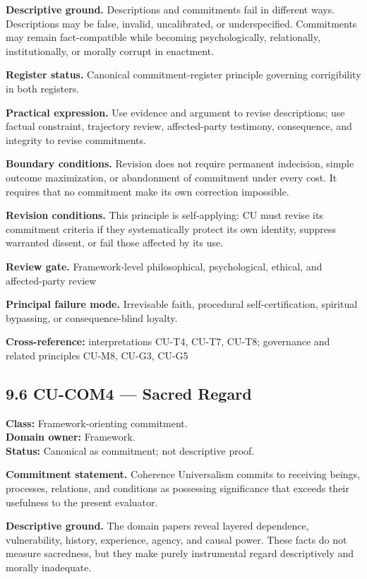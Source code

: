 \documentclass[
  11pt,
]{article}
\begin{document}
\textbf{Descriptive ground.} Descriptions and commitments fail in
different ways. Descriptions may be false, invalid, uncalibrated, or
underspecified. Commitments may remain fact-compatible while becoming
psychologically, relationally, institutionally, or morally corrupt in
enactment.

\textbf{Register status.} Canonical commitment-register principle
governing corrigibility in both registers.

\textbf{Practical expression.} Use evidence and argument to revise
descriptions; use factual constraint, trajectory review, affected-party
testimony, consequence, and integrity to revise commitments.

\textbf{Boundary conditions.} Revision does not require permanent
indecision, simple outcome maximization, or abandonment of commitment
under every cost. It requires that no commitment make its own correction
impossible.

\textbf{Revision conditions.} This principle is self-applying: CU must
revise its commitment criteria if they systematically protect its own
identity, suppress warranted dissent, or fail those affected by its use.

\textbf{Review gate.} Framework-level philosophical, psychological,
ethical, and affected-party review

\textbf{Principal failure mode.} Irrevisable faith, procedural
self-certification, spiritual bypassing, or consequence-blind loyalty.

\textbf{Cross-reference:} interpretations CU-T4, CU-T7, CU-T8;
governance and related principles CU-M8, CU-G3, CU-G5

\subsection{9.6 CU-COM4 --- Sacred Regard}\label{cu-com4-sacred-regard}

\textbf{Class:} Framework-orienting commitment.\\
\textbf{Domain owner:} Framework.\\
\textbf{Status:} Canonical as commitment; not descriptive proof.

\textbf{Commitment statement.} Coherence Universalism commits to
receiving beings, processes, relations, and conditions as possessing
significance that exceeds their usefulness to the present evaluator.

\textbf{Descriptive ground.} The domain papers reveal layered
dependence, vulnerability, history, experience, agency, and causal
power. These facts do not measure sacredness, but they make purely
instrumental regard descriptively and morally inadequate.
\end{document}
